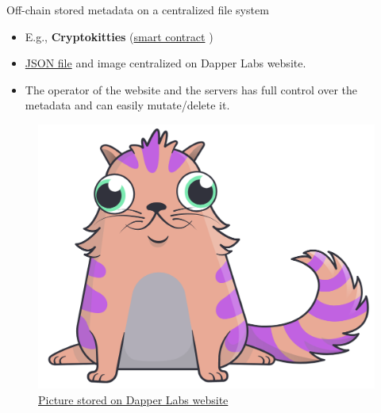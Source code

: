 \documentclass[handout]{beamer}
\begin{document}
\begin{frame}{Off-chain stored metadata on a centralized file system}

\begin{itemize}
	\item E.g., \textbf{Cryptokitties} (\href{https://etherscan.io/address/0x06012c8cf97bead5deae237070f9587f8e7a266d}{\link smart contract} )
	\item \href{https://api.cryptokitties.co/kitties/2252}{\link  JSON file} and image centralized on Dapper Labs website.
	\item The operator of the website and the servers has full control over the metadata and can easily mutate/delete it.
\end{itemize}
\vspace{1em}
\begin{figure}
	\centering
	\includegraphics[scale=0.2]{../assets/images/cryptokitty.png}
	\caption*{\link \href{https://img.cn.cryptokitties.co/0x06012c8cf97bead5deae237070f9587f8e7a266d/2252.svg} {Picture stored on Dapper Labs website}}
\end{figure}
\end{frame}
\end{document}
